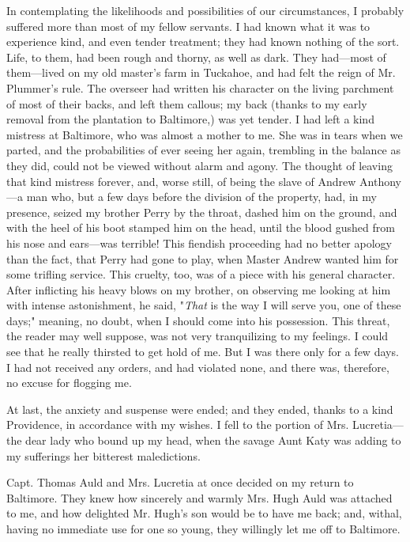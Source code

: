 In contemplating the likelihoods and possibilities of our circumstances,
I probably suffered more than most of my fellow servants. I had known
what it was to experience kind, and even tender treatment; they had
known nothing of the sort. Life, to them, had been rough and thorny, as
well as dark. They had---most of them---lived on my old master's farm in
Tuckahoe, and had felt the reign of Mr. Plummer's rule. The overseer had
written his character on the living parchment of most of their backs,
and left them callous; my back (thanks to my early removal from the
plantation to Baltimore,) was yet tender. I had left a kind mistress at
Baltimore, who was almost a mother to me. She was in tears when we
parted, and the probabilities of ever seeing her again, trembling
{\protect\hypertarget{178}{}{}} in the balance as they did, could not be
viewed without alarm and agony. The thought of leaving that kind
mistress forever, and, worse still, of being the slave of Andrew
Anthony---a man who, but a few days before the division of the property,
had, in my presence, seized my brother Perry by the throat, dashed him
on the ground, and with the heel of his boot stamped him on the head,
until the blood gushed from his nose and ears---was terrible! This
fiendish proceeding had no better apology than the fact, that Perry had
gone to play, when Master Andrew wanted him for some trifling service.
This cruelty, too, was of a piece with his general character. After
inflicting his heavy blows on my brother, on observing me looking at him
with intense astonishment, he said, "\emph{That} is the way I will serve
you, one of these days;" meaning, no doubt, when I should come into his
possession. This threat, the reader may well suppose, was not very
tranquilizing to my feelings. I could see that he really thirsted to get
hold of me. But I was there only for a few days. I had not received any
orders, and had violated none, and there was, therefore, no excuse for
flogging me.

At last, the anxiety and suspense were ended; and they ended, thanks to
a kind Providence, in accordance with my wishes. I fell to the portion
of Mrs. Lucretia---the dear lady who bound up my head, when the savage
Aunt Katy was adding to my sufferings her bitterest maledictions.

Capt. Thomas Auld and Mrs. Lucretia at once decided on my return to
Baltimore. They knew how sincerely and warmly Mrs. Hugh Auld was
attached {\protect\hypertarget{179}{}{}}to me, and how delighted Mr.
Hugh's son would be to have me back; and, withal, having no immediate
use for one so young, they willingly let me off to Baltimore.

